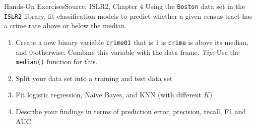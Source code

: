 \documentclass[ignorenonframetext,xcolor=x11names]{beamer}
\begin{document}
\begin{frame}{Hands-On Exercises}{Source: ISLR2, Chapter 4}
Using the \texttt{Boston} data set in the \texttt{ISLR2} library, fit classification models to predict whether a given census tract has a crime rate above or below the median.
\begin{enumerate}
   \item Create a new binary variable \texttt{crime01} that is $1$ is \texttt{crime} is above its median, and $0$ otherwise. Combine this variable with the data frame. \emph{Tip}: Use the \texttt{median()} function for this.
   \item Split your data set into a training and test data set
   \item Fit logistic regression, Naive Bayes, and KNN (with different $K$)
   \item Describe your findings in terms of prediction error, precision, recall, F1 and AUC
\end{enumerate}
\end{frame}
\end{document}
